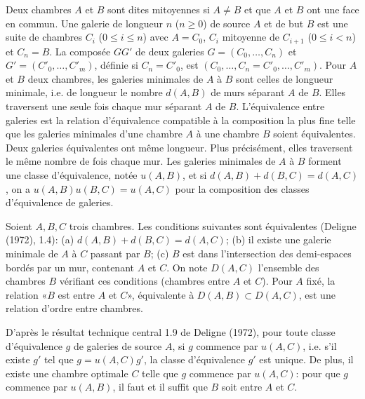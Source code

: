 \documentclass[11pt]{article}
\begin{document}
Deux chambres $A$ et $B$ sont dites mitoyennes si $A\ne B$ et que $A$ et $B$ ont une face en commun. Une galerie de longueur $n$ ($n\geq0$) de source $A$ et de but $B$ est une suite de chambres $C_i$ ($0\leq i\leq n$) avec $A=C_0$, $C_i$ mitoyenne de $C_{i+1}$ ($0\leq i<n$) et $C_n=B$. La composée $GG'$ de deux galeries $G=(C_0,\ldots,C_n)$ et $G'=(C'_0,\ldots,C'_m)$, définie si $C_n=C'_0$, est $(C_0,\ldots,C_n=C'_0,\ldots,C'_m)$. Pour $A$ et $B$ deux chambres, les galeries minimales de $A$ à $B$ sont celles de longueur minimale, i.e. de longueur le nombre $d(A,B)$ de murs séparant $A$ de $B$. Elles traversent une seule fois chaque mur séparant $A$ de $B$. L'équivalence entre galeries est la relation d'équivalence compatible à la composition la plus fine telle que les galeries minimales d'une chambre $A$ à une chambre $B$ soient équivalentes. Deux galeries équivalentes ont même longueur. Plus précisément, elles traversent le même nombre de fois chaque mur. Les galeries minimales de $A$ à $B$ forment une classe d'équivalence, notée $u(A,B)$, et si $d(A,B)+d(B,C)=d(A,C)$, on a $u(A,B)u(B,C)=u(A,C)$ pour la composition des classes d'équivalence de galeries.

Soient $A,B,C$ trois chambres. Les conditions suivantes sont équivalentes (Deligne (1972), 1.4): (a) $d(A,B)+d(B,C)=d(A,C)$; (b) il existe une galerie minimale de $A$ à $C$ passant par $B$; (c) $B$ est dans l'intersection des demi-espaces bordés par un mur, contenant $A$ et $C$. On note $D(A,C)$ l'ensemble des chambres $B$ vérifiant ces conditions (chambres entre $A$ et $C$). Pour $A$ fixé, la relation «$B$ est entre $A$ et $C$», équivalente à $D(A,B)\subset D(A,C)$, est une relation d'ordre entre chambres.

D'après le résultat technique central 1.9 de Deligne (1972), pour toute classe d'équivalence $g$ de galeries de source $A$, si $g$ commence par $u(A,C)$, i.e. s'il existe $g'$ tel que $g=u(A,C)g'$, la classe d'équivalence $g'$ est unique. De plus, il existe une chambre optimale $C$ telle que $g$ commence par $u(A,C)$: pour que $g$ commence par $u(A,B)$, il faut et il suffit que $B$ soit entre $A$ et $C$.
\end{document}
